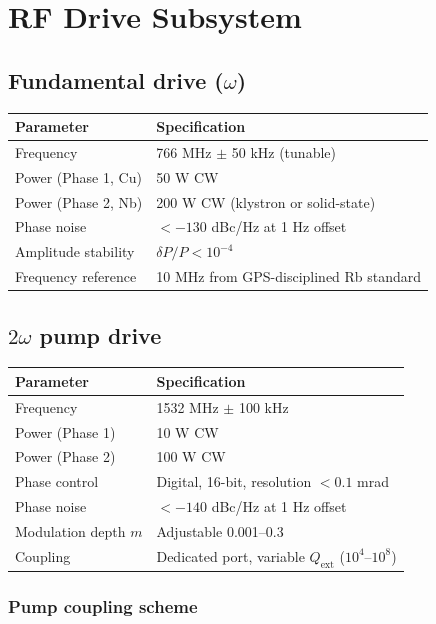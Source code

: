 \documentclass[12pt,letterpaper]{article}
\begin{document}
\section{RF Drive Subsystem}

\subsection{Fundamental drive ($\omega$)}

\begin{tabular}{ll}
\toprule
Parameter & Specification \\
\midrule
Frequency & 766 MHz $\pm$ 50 kHz (tunable) \\
Power (Phase 1, Cu) & 50 W CW \\
Power (Phase 2, Nb) & 200 W CW (klystron or solid-state) \\
Phase noise & $< -130$ dBc/Hz at 1 Hz offset \\
Amplitude stability & $\delta P/P < 10^{-4}$ \\
Frequency reference & 10 MHz from GPS-disciplined Rb standard \\
\bottomrule
\end{tabular}

\subsection{$2\omega$ pump drive}

\begin{tabular}{ll}
\toprule
Parameter & Specification \\
\midrule
Frequency & 1532 MHz $\pm$ 100 kHz \\
Power (Phase 1) & 10 W CW \\
Power (Phase 2) & 100 W CW \\
Phase control & Digital, 16-bit, resolution $< 0.1$ mrad \\
Phase noise & $< -140$ dBc/Hz at 1 Hz offset \\
Modulation depth $m$ & Adjustable 0.001--0.3 \\
Coupling & Dedicated port, variable $Q_{\text{ext}}$ ($10^4$--$10^8$) \\
\bottomrule
\end{tabular}

\subsubsection{Pump coupling scheme}
\end{document}

